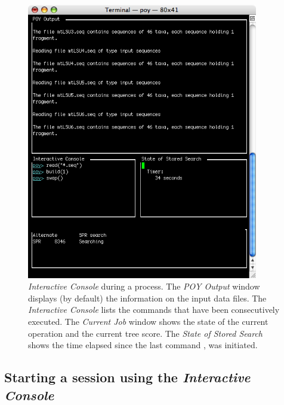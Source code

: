 {\begin{figure}[htbp]
   \centering
   \includegraphics[width=0.9\textwidth]{doc/figures/figprocess.jpg}
   \caption{\poy \emph{Interactive Console} during a process. The \emph{POY Output} window displays (by default) the information 
   on the input data files. The \emph{Interactive Console} lists the commands that have been consecutively executed. The 
   \emph{Current Job} window shows the state of the current operation and the current tree score. The \emph{State of Stored Search} 
   shows the time elapsed  since the last command , was initiated.}
   \label{fig:figprocess}
\end{figure}



\subsection{Starting a \poy session using the \emph{Interactive Console}}

}
